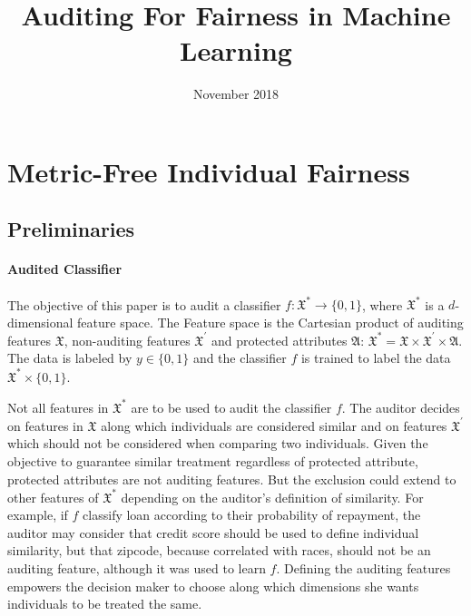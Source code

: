 \documentclass{article}
\title{Auditing For Fairness in Machine Learning}
\author{}
\date{November 2018}
\begin{document}
\maketitle

\section{Metric-Free Individual Fairness}
\subsection{Preliminaries}

\paragraph{Audited Classifier}
The objective of this paper is to audit a classifier $f:\mathfrak{X}^{*} \rightarrow \{0,1\}$, where $\mathfrak{X}^{*}$ is a $d$-dimensional feature space. The Feature space is the Cartesian product of auditing features $\mathfrak{X}$, non-auditing features $\mathfrak{X}^{'}$ and protected attributes $\mathfrak{A}$: $\mathfrak{X}^{*} = \mathfrak{X} \times \mathfrak{X}^{'} \times \mathfrak{A}$.  The data is labeled by $y\in \{0, 1\}$ and the classifier $f$ is trained to label the data $\mathfrak{X}^{*}\times \{0, 1\}$. 

\bigskip
Not all features in $\mathfrak{X}^{*}$ are to be used to audit the classifier $f$. The auditor decides on features in $\mathfrak{X}$ along which individuals are considered similar and on features $\mathfrak{X}^{'}$ which should not be considered when  comparing two individuals.  Given the objective to guarantee similar treatment regardless of protected attribute, protected attributes are not auditing features. But the exclusion could extend to other features of $\mathfrak{X}^{*}$ depending on the auditor's definition of similarity. For example, if $f$ classify loan according to their probability of repayment, the auditor may consider that credit score should be used to define individual similarity, but that zipcode, because correlated with races, should not be an auditing feature, although it was used to learn $f$.  Defining the auditing features empowers the decision maker to choose along which dimensions she wants individuals to be treated the same.
\end{document}
